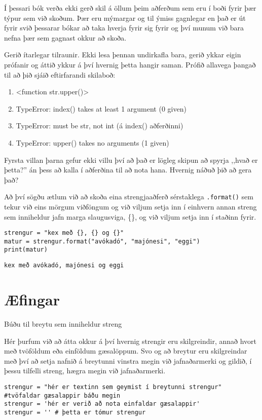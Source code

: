 Í þessari bók verða ekki gerð skil á öllum þeim aðferðum sem eru í boði fyrir þær týpur sem við skoðum.
Þær eru mýmargar og til ýmiss gagnlegar en það er út fyrir svið þessarar bókar að taka hverja fyrir sig fyrir og því munum við bara nefna þær sem gagnast okkur að skoða.

Gerið ítarlegar tilraunir.
Ekki lesa þennan undirkafla bara, gerið ykkar eigin prófanir og áttið ykkur á því hvernig þetta hangir saman.
Prófið allavega þangað til að þið sjáið eftirfarandi skilaboð:
\begin{enumerate}
	\item <function str.upper()> 
	\item TypeError: index() takes at least 1 argument (0 given)
	\item TypeError: must be str, not int (á index() aðferðinni)
	\item TypeError: upper() takes no arguments (1 given)
\end{enumerate}

Fyrsta villan þarna gefur ekki villu því að það er lögleg skipun að spyrja ,,hvað er þetta?'' án þess að kalla í aðferðina til að nota hana.
Hvernig náðuð þið að gera það? 


Að því sögðu ætlum við að skoða eina strengjaaðferð sérstaklega \texttt{.format()} sem tekur við eins mörgum viðföngum og við viljum setja inn í einhvern annan streng sem inniheldur jafn marga slaugusviga, \{\}, og við viljum setja inn í staðinn fyrir.

\begin{lstlisting}[caption=Aðferðin .format() kynnt, label=lst:str-format]
strengur = "kex með {}, {} og {}"
matur = strengur.format("avókadó", "majónesi", "eggi")
print(matur)
\end{lstlisting}
\lstset{style=uttak}
\begin{lstlisting}
kex með avókadó, majónesi og eggi
\end{lstlisting}
\lstset{style=venjulegt}
\newpage
\section{Æfingar}
\begin{exercise}\label{str1}
	Búðu til breytu sem inniheldur streng
\end{exercise}
\begin{Answer}[ref={str1}]
	Hér þurfum við að átta okkur á því hvernig strengir eru skilgreindir, annað hvort með tvöföldum eða einföldum gæsalöppum.
	Svo og að breytur eru skilgreindar með því að setja nafnið á breytunni vinstra megin við jafnaðarmerki og gildið, í þessu tilfelli streng, hægra megin við jafnaðarmerki.
	\begin{lstlisting}
strengur = "hér er textinn sem geymist í breytunni strengur" #tvöfaldar gæsalappir báðu megin
strengur = 'hér er verið að nota einfaldar gæsalappir'
strengur = '' # þetta er tómur strengur\end{lstlisting}
\end{Answer}


